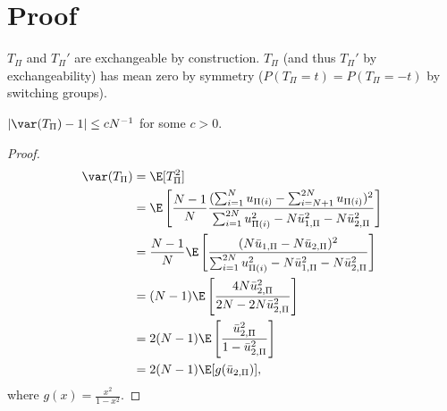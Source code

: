 \section{Proof}
$T_{\Pi}$ and $T_{\Pi}'$ are exchangeable by construction.  $T_{\Pi}$ (and thus $T_{\Pi}'$ by
exchangeability) has mean zero by symmetry ($P(T_{\Pi} = t) = P(T_{\Pi} = -t)$ by
switching groups).

\begin{proposition}
  $|\var(T_{\Pi})-1| \leq cN^{-1}$ for some $c>0$.
\end{proposition}
\begin{proof}
  \begin{align}
    \var(T_{\Pi}) &= \E[T_{\Pi}^2] \nonumber \\
    &= \E \left [\frac{N-1}{N} \frac{
        (\sum_{i=1}^N u_{\Pi(i)} - \sum_{i=N+1}^{2N}u_{\Pi(i)})^2}
      {\sum_{i=1}^{2N}u_{\Pi(i)}^2-N\bar{u}_{1,\Pi}^2-N\bar{u}_{2,\Pi}^2} \right ] \nonumber \\
    &= \frac{N-1}{N} \E \left [\frac{
        (N\bar{u}_{1,\Pi}-N\bar{u}_{2,\Pi})^2}
      {\sum_{i=1}^{2N}u_{\Pi(i)}^2-N\bar{u}_{1,\Pi}^2-N\bar{u}_{2,\Pi}^2} \right ] \nonumber \\
    &= (N-1)\E \left [\frac{
        4 N\bar{u}_{2,\Pi}^2}{2N-2N\bar{u}_{2,\Pi}^2} \right ] \nonumber \\
    &= 2(N-1)\E \left [\frac{
        \bar{u}_{2,\Pi}^2}{1-\bar{u}_{2,\Pi}^2} \right ] \nonumber \\
    &= 2(N-1) \E[g(\bar{u}_{2,\Pi})], \label{def:varT}
  \end{align}
  where $g(x) = \frac{x^2}{1-x^2}$. 


\end{proof}
